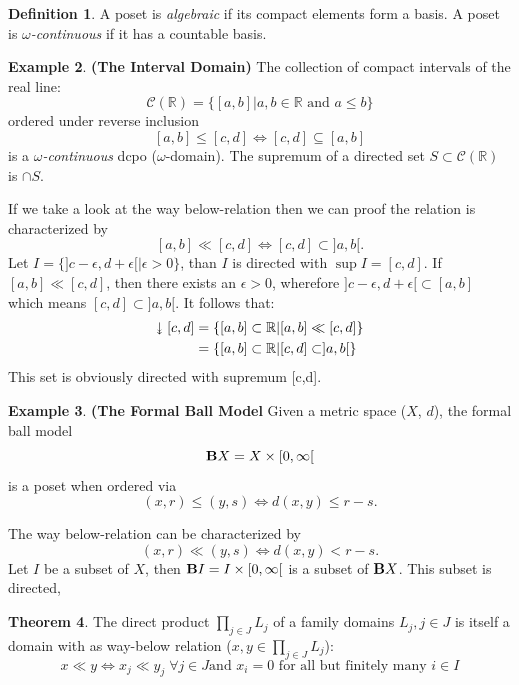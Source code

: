 \documentclass[a4paper,12pt]{article}
\newcommand{\downdownarrow}{\mathrel{\reflectbox{\rotatebox[origin=c]{90}{$\twoheadleftarrow$}}}}
\theoremstyle{definition}
\newtheorem{theorem}{Theorem}[section]
\newtheorem{example}[theorem]{Example}
\newtheorem{definition}[theorem]{Definition}
\newcommand{\R}{{\mathbb R}}
\begin{document}
\begin{definition}
A poset is \emph{algebraic} if its compact elements form a basis. A poset is \emph{$\omega$-continuous} if it has a countable basis.
\end{definition}

\begin{example} \textbf{(The Interval Domain)}
The collection of compact intervals of the real line:
$$\mathcal{C}(\R) = \{[a, b] | a, b \in \R \text{ and } a \leq b \}$$
ordered under reverse inclusion
$$[a, b] \leq [c, d] \Leftrightarrow [c, d] \subseteq [a, b]$$
is a \emph{$\omega$-continuous} dcpo ($\omega$-domain). The supremum of a directed set $S \subset \mathcal{C}(\R)$ is $\cap S$.

If we take a look at the way below-relation then we can proof the relation is characterized by $$[a, b] \ll [c, d] \Leftrightarrow [c, d] \subset ]a, b[.$$ Let $I = \{]c-\epsilon, d + \epsilon[ | \epsilon > 0 \}$, than $I$ is directed with $\sup I = [c, d]$. If $[a, b] \ll [c, d]$, then there exists an $\epsilon > 0$, wherefore $]c-\epsilon, d + \epsilon[ \subset [a, b]$ which means $[c, d] \subset ]a, b[$. It follows that:
\begin{eqnarray*}
\downdownarrow [c, d] &= \{ [a, b] \subset \R | [a, b] \ll [c, d]  \} \\
&= \{ [a, b] \subset \R | [c, d] \subset ]a, b[  \}
\end{eqnarray*}
This set is obviously directed with supremum [c,d].
\end{example}

\begin{example} \textbf{(The Formal Ball Model}
Given a metric space ($X$, $d$), the formal ball model
$$\text{\textbf{B}}X = X \times [0, \infty[$$
is a poset when ordered via
$$(x, r) \leq (y, s) \Leftrightarrow d(x, y) \leq r - s.$$

The way below-relation can be characterized by $$(x, r) \ll (y, s) \Leftrightarrow d(x,y) < r - s.$$ Let $I$ be a subset of $X$, then $\text{\textbf{B}}I = I \times [0, \infty[$ is a subset of $\text{\textbf{B}}X$. This subset is directed,


\end{example}
\begin{theorem}
The direct product $\prod_{j\in J}L_j$ of a family domains $L_j, j \in J$ is itself a domain with as way-below relation ($x, y \in \prod_{j \in J}L_j$):
$$x \ll y \Leftrightarrow x_j \ll y_j \;\forall j \in J \text{and } x_i = 0 \text{ for all but finitely many } i \in I$$
\end{theorem}
\end{document}
